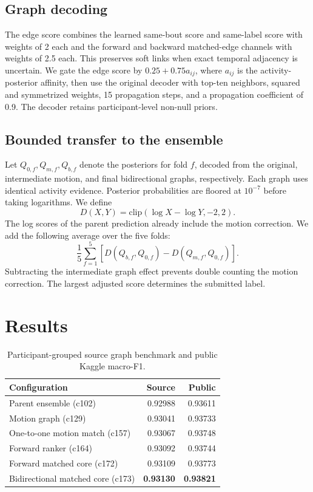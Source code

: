 \documentclass[sigconf,nonacm]{acmart}
\begin{document}
\subsection{Graph decoding}
The edge score combines the learned same-bout score and same-label score with weights of 2 each and the forward and backward matched-edge channels with weights of 2.5 each. This preserves soft links when exact temporal adjacency is uncertain. We gate the edge score by \(0.25+0.75a_{ij}\), where \(a_{ij}\) is the activity-posterior affinity, then use the original decoder with top-ten neighbors, squared and symmetrized weights, 15 propagation steps, and a propagation coefficient of 0.9. The decoder retains participant-level non-null priors.

\subsection{Bounded transfer to the ensemble}
Let \(Q_{0,f}, Q_{m,f}, Q_{b,f}\) denote the posteriors for fold \(f\), decoded from the original, intermediate motion, and final bidirectional graphs, respectively. Each graph uses identical activity evidence. Posterior probabilities are floored at \(10^{-7}\) before taking logarithms. We define
\[
D(X,Y)=\mathrm{clip}(\log X-\log Y,-2,2).
\]
The log scores of the parent prediction already include the motion correction. We add the following average over the five folds:
\[
\frac{1}{5}\sum_{f=1}^{5}
\left[D(Q_{b,f},Q_{0,f})-D(Q_{m,f},Q_{0,f})\right].
\]
Subtracting the intermediate graph effect prevents double counting the motion correction. The largest adjusted score determines the submitted label.

\section{Results}
\begin{table}[t]
\caption{Participant-grouped source graph benchmark and public Kaggle macro-F1.}
\label{tab:results}
\begin{tabular}{lrr}
\toprule
Configuration & Source & Public\\
\midrule
Parent ensemble (c102) & 0.92988 & 0.93611\\
Motion graph (c129) & 0.93041 & 0.93733\\
One-to-one motion match (c157) & 0.93067 & 0.93748\\
Forward ranker (c164) & 0.93092 & 0.93744\\
Forward matched core (c172) & 0.93109 & 0.93773\\
Bidirectional matched core (c173) & \textbf{0.93130} & \textbf{0.93821}\\
\bottomrule
\end{tabular}
\end{table}
\end{document}
